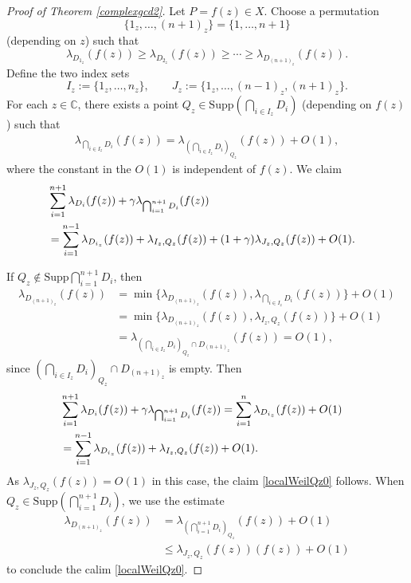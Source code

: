 \documentclass[10pt]{amsart}
\numberwithin{equation}{section}
\theoremstyle{plain}
\theoremstyle{definition}
\begin{document}
\begin{proof}[Proof of Theorem \ref{complexgcd2}]
Let $P=f(z)\in X$.  Choose a permutation
\[
\{1_z,\ldots,(n+1)_z\}=\{1,\ldots,n+1\}
\]
(depending on $z$) such that
\[
\lambda_{D_{1_z}}(f(z)) \ge \lambda_{D_{2_z}}(f(z)) \ge \cdots \ge \lambda_{D_{(n+1)_z}}(f(z)).
\]
Define the two index sets
\[
I_z:=\{1_z,\ldots,n_z\},\qquad 
J_z:=\{1_z,\ldots,(n-1)_z,(n+1)_z\}.
\]
For each $z\in \mathbb C$, there exists a point $Q_z\in \text{Supp} (\bigcap_{i \in I_z} D_{i})$ (depending on $f(z)$) such that
\begin{align*}
\lambda_{\bigcap_{i \in I_z} D_{i}}(f(z))=\lambda_{ (\bigcap_{i \in I_z} D_{i})_{Q_z}}(f(z))+O(1),
\end{align*}
where the constant in the $O(1)$ is independent of $f(z)$.
We claim 
\begin{align}\label{localWeilQz0}
 &\sum_{i=1}^{n+1}\lambda_{ D_{i}}(f(z))+ \gamma \lambda_{\bigcap_{i=1}^{n+1}D_{i}} (f(z)) \cr
& = \sum_{i=1}^{n-1}\lambda_{D_{i_z}}(f(z))  +\lambda_{   I_z,Q_z }(f(z))+  (1+\gamma) \lambda_{ J_z,Q_z }(f(z))+O(1). 
\end{align}
 

If $Q_z\not\in \text{Supp} \bigcap_{i=1}^{n+1}D_{i}$, then
\begin{align*}
\lambda_{ D_{(n+1)_z}   }(f(z))&=\min \{\lambda_{D_{(n+1)_z} }(f(z)),\lambda_{\bigcap_{i  \in I_z} D_i}(f(z))\}+O(1)\\
&=\min \{\lambda_{D_{(n+1)_z} }(f(z)),\lambda_{   I_z,Q_z }(f(z))\}+O(1)\\
&=\lambda_{(\bigcap_{i \in I_z} D_{i})_{Q_z}\cap D_{(n+1)_z}}(f(z))=O(1),  
\end{align*}
since $({\bigcap_{i \in I_z} D_{i}})_{Q_z}\cap D_{(n+1)_z}$ is empty.  
Then
\begin{align*}
  &\sum_{i=1}^{n+1}\lambda_{ D_{i}}(f(z)) + \gamma \lambda_{\bigcap_{i=1}^{n+1}D_{i}} (f(z)) 
 = \sum_{i=1}^{n}\lambda_{ D_{i_z}}(f(z)) +O(1)\cr
&= \sum_{i=1}^{n-1}\lambda_{D_{i_z}}(f(z))  +\lambda_{   I_z,Q_z }(f(z))+O(1).
\end{align*}
As $\lambda_{J_z,Q_z }(f(z))=O(1)$ in this case, the claim \eqref{localWeilQz0} follows.
When $Q_z\in \text{Supp} (\bigcap_{i=1}^{n+1} D_{i})$, %
we use the estimate
\begin{align*}
\lambda_{ D_{(n+1)_z} } (f(z)) &=\lambda_{(\bigcap_{i=1}^{n+1} D_{i})_{Q_z}} (f(z)) +O(1)\\
&\leq \lambda_{ J_z,Q_z }(f(z)) (f(z) )+O(1) 
\end{align*}
to conclude the calim  \eqref{localWeilQz0}.


\end{proof}
\end{document}
